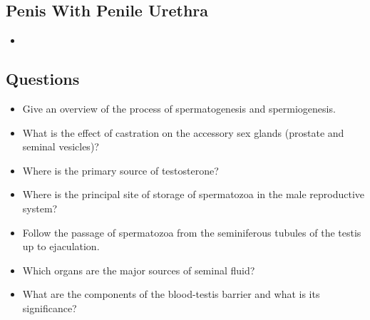 \subsection{Penis With Penile Urethra}
\begin{center}
\end{center} 
\begin{itemize}
  \item 
\end{itemize}

\subsection{Questions}
\begin{itemize}\color{minor}
  \item Give an overview of the process of spermatogenesis and spermiogenesis.
  \basec{\begin{itemize}
    \item 
  \end{itemize}}

  \item What is the effect of castration on the accessory sex glands (prostate and seminal vesicles)?
  \basec{\begin{itemize}
    \item 
  \end{itemize}}

  \item Where is the primary source of testosterone?
  \basec{\begin{itemize}
    \item 
  \end{itemize}}

  \item Where is the principal site of storage of spermatozoa in the male reproductive system?
  \basec{\begin{itemize}
    \item 
  \end{itemize}}

  \item Follow the passage of spermatozoa from the seminiferous tubules of the testis up to ejaculation.
  \basec{\begin{itemize}
    \item 
  \end{itemize}}

  \item Which organs are the major sources of seminal fluid?
  \basec{\begin{itemize}
    \item 
  \end{itemize}}

  \item What are the components of the blood-testis barrier and what is its significance?
  \basec{\begin{itemize}
    \item 
  \end{itemize}}
\end{itemize}

